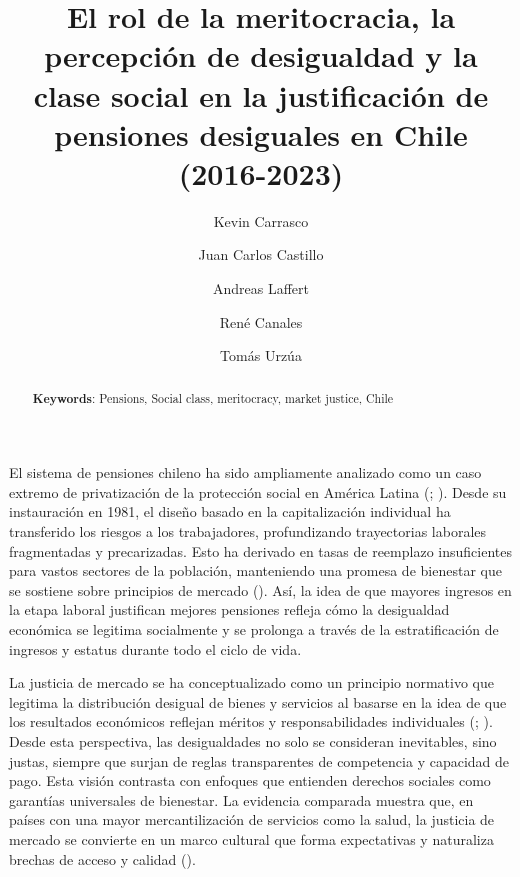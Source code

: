 \documentclass[
  12pt,
  letterpaper,
  DIV=11,
  numbers=noendperiod]{scrartcl}
\title{El rol de la meritocracia, la percepción de desigualdad y la
clase social en la justificación de pensiones desiguales en Chile
(2016-2023)}
\author{Kevin Carrasco \and Juan Carlos Castillo \and Andreas
Laffert \and René Canales \and Tomás Urzúa}
\date{}
\begin{document}
\maketitle
\begin{abstract}
\newline

\textbf{Keywords}: Pensions, Social class, meritocracy, market justice,
Chile
\end{abstract}


El sistema de pensiones chileno ha sido ampliamente analizado como un
caso extremo de privatización de la protección social en América Latina
(;
). Desde su
instauración en 1981, el diseño basado en la capitalización individual
ha transferido los riesgos a los trabajadores, profundizando
trayectorias laborales fragmentadas y precarizadas. Esto ha derivado en
tasas de reemplazo insuficientes para vastos sectores de la población,
manteniendo una promesa de bienestar que se sostiene sobre principios de
mercado ().
Así, la idea de que mayores ingresos en la etapa laboral justifican
mejores pensiones refleja cómo la desigualdad económica se legitima
socialmente y se prolonga a través de la estratificación de ingresos y
estatus durante todo el ciclo de vida.

La justicia de mercado se ha conceptualizado como un principio normativo
que legitima la distribución desigual de bienes y servicios al basarse
en la idea de que los resultados económicos reflejan méritos y
responsabilidades individuales
(;
). Desde esta perspectiva,
las desigualdades no solo se consideran inevitables, sino justas,
siempre que surjan de reglas transparentes de competencia y capacidad de
pago. Esta visión contrasta con enfoques que entienden derechos sociales
como garantías universales de bienestar. La evidencia comparada muestra
que, en países con una mayor mercantilización de servicios como la
salud, la justicia de mercado se convierte en un marco cultural que
forma expectativas y naturaliza brechas de acceso y calidad
().
\end{document}

